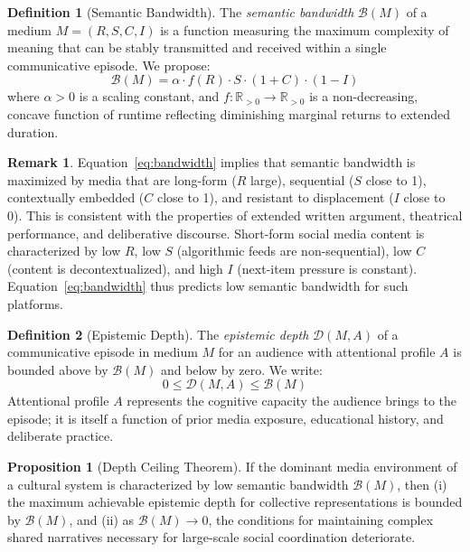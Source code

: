 \documentclass[12pt]{article}
\theoremstyle{definition}
\newtheorem{definition}{Definition}[section]
\newtheorem{proposition}{Proposition}[section]
\newtheorem{remark}{Remark}[section]
\theoremstyle{plain}
\begin{document}
\begin{definition}[Semantic Bandwidth]
The \emph{semantic bandwidth} $\mathcal{B}(M)$ of a medium $M = (R, S, C, I)$ is a function measuring the maximum complexity of meaning that can be stably transmitted and received within a single communicative episode. We propose:
\begin{equation}
\mathcal{B}(M) = \alpha \cdot f(R) \cdot S \cdot (1 + C) \cdot (1 - I)
\label{eq:bandwidth}
\end{equation}
where $\alpha > 0$ is a scaling constant, and $f: \mathbb{R}_{>0} \to \mathbb{R}_{>0}$ is a non-decreasing, concave function of runtime reflecting diminishing marginal returns to extended duration.
\end{definition}

\begin{remark}
Equation~\eqref{eq:bandwidth} implies that semantic bandwidth is maximized by media that are long-form ($R$ large), sequential ($S$ close to 1), contextually embedded ($C$ close to 1), and resistant to displacement ($I$ close to 0). This is consistent with the properties of extended written argument, theatrical performance, and deliberative discourse. Short-form social media content is characterized by low $R$, low $S$ (algorithmic feeds are non-sequential), low $C$ (content is decontextualized), and high $I$ (next-item pressure is constant). Equation~\eqref{eq:bandwidth} thus predicts low semantic bandwidth for such platforms.
\end{remark}

\begin{definition}[Epistemic Depth]
The \emph{epistemic depth} $\mathcal{D}(M, A)$ of a communicative episode in medium $M$ for an audience with attentional profile $A$ is bounded above by $\mathcal{B}(M)$ and below by zero. We write:
\begin{equation}
0 \leq \mathcal{D}(M, A) \leq \mathcal{B}(M)
\end{equation}
Attentional profile $A$ represents the cognitive capacity the audience brings to the episode; it is itself a function of prior media exposure, educational history, and deliberate practice.
\end{definition}

\begin{proposition}[Depth Ceiling Theorem]
If the dominant media environment of a cultural system is characterized by low semantic bandwidth $\mathcal{B}(M)$, then (i) the maximum achievable epistemic depth for collective representations is bounded by $\mathcal{B}(M)$, and (ii) as $\mathcal{B}(M) \to 0$, the conditions for maintaining complex shared narratives necessary for large-scale social coordination deteriorate.
\end{proposition}
\end{document}

